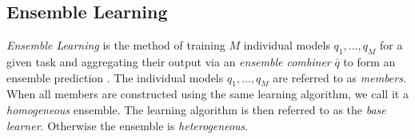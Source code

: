 \documentclass[
    a4paper, %
	fontsize=10pt, %
	twoside=false, %
]{kaobook}
\begin{document}
\begin{titlepage}





\chapter{Ensemble Learning}
\label{chapter:ensemble-learning}

\textit{Ensemble Learning} is the method of training $M$ individual models $q_{1}, \dots, q_{M}$ for a given task and aggregating their output via an \textit{ensemble combiner} $\bar{q}$ to form an ensemble prediction \cite{zhou_EnsembleMethodsFoundations_2012}.
The individual models $q_{1}, \dots, q_{M}$ are referred to as \textit{members}. When all members are constructed using the same learning algorithm, we call it a \textit{homogeneous} ensemble. The learning algorithm is then referred to as the \textit{base learner}. Otherwise the ensemble is \textit{heterogeneous}. 



\end{titlepage}
\end{document}
